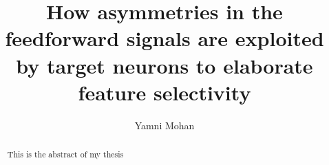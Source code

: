 \documentclass [12pt]{report}
\title{How asymmetries in the feedforward signals are exploited by target neurons to elaborate feature selectivity}
\author{Yamni Mohan}
\date{}
\begin{document}
	\maketitle
	\begin{abstract}
		This is the abstract of my thesis
	\end{abstract}

	\tableofcontents
	
%	
	
	
	
	
	
	
%	
%	
	
 


\end{document}
